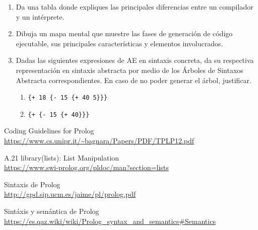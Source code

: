 \documentclass[letterpaper,11pt]{article}
\begin{document}
\begin{enumerate}
    \item Da una tabla donde expliques las principales diferencias entre un 
    compilador y un intérprete.

    \item Dibuja un mapa mental que muestre las fases de generación de código
    ejecutable, sus principales características y elementos involucrados.

    \item Dadas las siguientes expresiones de AE en sintaxis concreta, da su 
    respectiva representación en sintaxis abstracta por medio de los Árboles 
    de Sintaxos Abstracta correspondientes. En caso de no poder generar el
    árbol, justificar. 
    \begin{enumerate}
        \item \texttt{\{+ 18 \{- 15 \{+ 40 5\}\}\}}
        \item \texttt{\{+ \{- 15 \{+ 40\}\}\}}
    \end{enumerate}
\end{enumerate}

\begin{thebibliography}{10}
    Coding Guidelines for Prolog \\ 
    \url{https://www.cs.unipr.it/~bagnara/Papers/PDF/TPLP12.pdf}

    A.21 library(lists): List Manipulation \\
    \url{https://www.swi-prolog.org/pldoc/man?section=lists}

    Sintaxis de Prolog \\
    \url{http://gpd.sip.ucm.es/jaime/pl/prolog.pdf}

    Sintáxis y semántica de Prolog \\
    \url{https://es.qaz.wiki/wiki/Prolog_syntax_and_semantics#Semantics}
\end{thebibliography}
\end{document}
